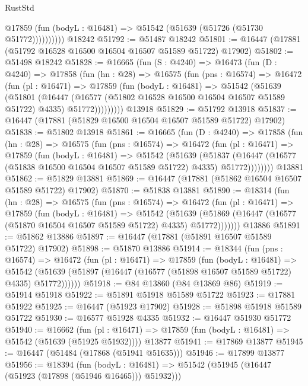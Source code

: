 \begin{lexlean}{RustStd}
\begin{coremodule}
{\begin{coremodule}
{{{{{{{{{{{{{{{{{{{{{{{{{{{{{{{{{{{{{{{{{{{{{{{{{{{{{{{              @17859 (fun (bodyL : @16481) => @51542 (@51639 (@51726 (@51730 @51772))))))))))
    @18242
@51792 := @51487 @18242
@51801 := @16447 (@17881 (@51792 @16528 @16500 @16504 @16507 @51589 @51722) @17902)
@51802 := @51498 @18242
@51828 := @16665
    (fun (S : @4240) =>
    @16473
      (fun (D : @4240) =>
      @17858
        (fun (hn : @28) =>
        @16575
          (fun (pns : @16574) =>
          @16472
            (fun (pl : @16471) =>
            @17859
              (fun (bodyL : @16481) =>
              @51542
                (@51639
                  (@51801
                    (@16447
                      (@16577 (@51802 @16528 @16500 @16504 @16507 @51589 @51722) @4335)
                      @51772)))))))))
    @13918
@51829 := @51792 @13918
@51837 := @16447 (@17881 (@51829 @16500 @16504 @16507 @51589 @51722) @17902)
@51838 := @51802 @13918
@51861 := @16665
    (fun (D : @4240) =>
    @17858
      (fun (hn : @28) =>
      @16575
        (fun (pns : @16574) =>
        @16472
          (fun (pl : @16471) =>
          @17859
            (fun (bodyL : @16481) =>
            @51542
              (@51639
                (@51837
                  (@16447 (@16577 (@51838 @16500 @16504 @16507 @51589 @51722) @4335) @51772))))))))
    @13881
@51862 := @51829 @13881
@51869 := @16447 (@17881 (@51862 @16504 @16507 @51589 @51722) @17902)
@51870 := @51838 @13881
@51890 := @18314
    (fun (hn : @28) =>
    @16575
      (fun (pns : @16574) =>
      @16472
        (fun (pl : @16471) =>
        @17859
          (fun (bodyL : @16481) =>
          @51542
            (@51639
              (@51869 (@16447 (@16577 (@51870 @16504 @16507 @51589 @51722) @4335) @51772)))))))
    @13886
@51891 := @51862 @13886
@51897 := @16447 (@17881 (@51891 @16507 @51589 @51722) @17902)
@51898 := @51870 @13886
@51914 := @18344
    (fun (pns : @16574) =>
    @16472
      (fun (pl : @16471) =>
      @17859
        (fun (bodyL : @16481) =>
        @51542 (@51639 (@51897 (@16447 (@16577 (@51898 @16507 @51589 @51722) @4335) @51772))))))
@51918 := @84 @13860 (@84 @13869 @86)
@51919 := @51914 @51918
@51922 := @51891 @51918 @51589 @51722
@51923 := @17881 @51922
@51925 := @16447 (@51923 @17902)
@51928 := @51898 @51918 @51589 @51722
@51930 := @16577 @51928 @4335
@51932 := @16447 @51930 @51772
@51940 := @16662
    (fun (pl : @16471) => @17859 (fun (bodyL : @16481) => @51542 (@51639 (@51925 @51932))))
    @13877
@51941 := @17869 @13877
@51945 := @16447 (@51484 (@17868 (@51941 @51635)))
@51946 := @17899 @13877
@51956 := @18394
    (fun (bodyL : @16481) => @51542 (@51945 (@16447 (@51923 (@17898 (@51946 @16465))) @51932)))
}}}}}}}}}}}}}}}}}}}}}}}}}}}}}}}}}}}}}}}}}}}}}}}}}}}}}}}
\end{coremodule}}
\end{coremodule}
\end{lexlean}
